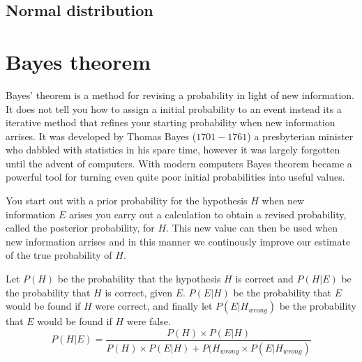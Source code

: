 \subsection{Normal distribution}

\section{Bayes theorem}
Bayes’ theorem is a method for revising a probability in light of new information. It does not tell you how to assign a initial probability to an event instead its a iterative method that refines your starting probability when new information arrises. It was developed by Thomas Bayes ($1701-1761$) a presbyterian minister who dabbled with statistics in his spare time, however it was largely forgotten until the advent of computers. With modern computers Bayes theorem became a powerful tool for turning even quite poor initial probabilities into useful values.


You start out with a prior probability for the hypothesis $H$ when new information $E$ arises you carry out a calculation to obtain a revised probability, called the posterior probability, for $H$. This new value can then be used when new information arrises and in this manner we continously improve our estimate of the true probability of $H$.

Let $P(H)$ be the probability that the hypothesis $H$ is correct and $P(H|E)$ be the probability that $H$ is correct, given $E$. $P(E|H)$ be the probability that $E$ would be found if $H$ were correct, and finally let $P(E|H_{wrong})$ be the probability that $E$ would be found if $H$ were false.
\[
P(H|E) = \frac{P(H) \times P(E|H)}{P(H) \times P(E|H) + P(H_{wrong} \times P(E|H_{wrong})}
\]

